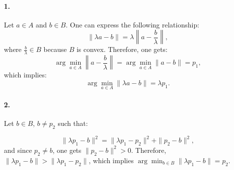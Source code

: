 \paragraph{1.}
Let \( a \in A \) and \( b \in B \).
One can express the following relationship:
\[
\|\lambda a - b\| = \lambda \left\|a - \frac{b}{\lambda}\right\|,
\]
where \(\frac{b}{\lambda} \in B\) because \(B\) is convex. 
Therefore, one gets:
\[
\arg \min_{a \in A} \left\|a - \frac{b}{\lambda}\right\| = \arg \min_{a \in A} \|a - b\| = p_1,
\]
which implies:
\[
\arg \min_{a \in A} \|\lambda a - b\| = \lambda p_1.
\]

\paragraph{2.}
Let \( b \in B \), \( b \neq p_2 \) such that:

\[
\|\lambda p_1 - b\|^2 = \|\lambda p_1 - p_2\|^2 + \|p_2 - b\|^2,
\]
and since \( p_2 \neq b \), one gets \( \|p_2 - b\|^2 > 0 \). 
Therefore, \( \|\lambda p_1 - b\| > \|\lambda p_1 - p_2\| \), which implies \( \arg \min_{b \in B} \|\lambda p_1 - b\| = p_2 \).

